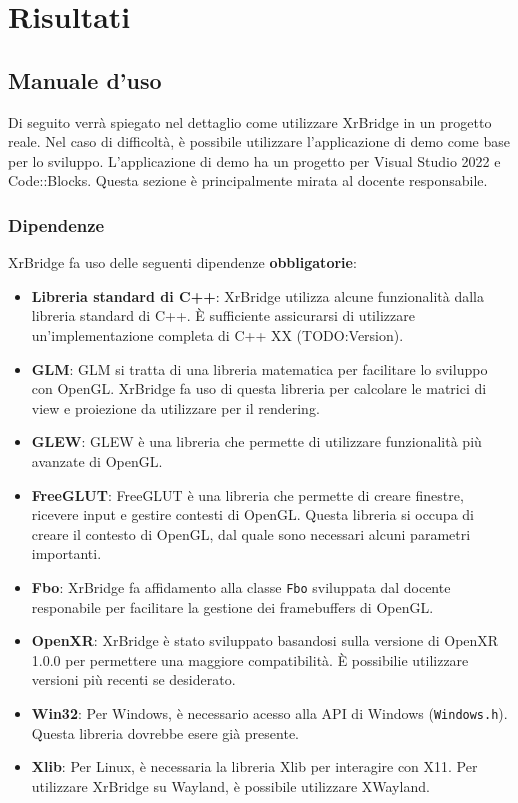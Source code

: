 \documentclass[twoside]{supsistudent}
\begin{document}
\chapter{Risultati}


\section{Manuale d'uso}

Di seguito verrà spiegato nel dettaglio come utilizzare XrBridge in un progetto reale. Nel caso di difficoltà, è possibile utilizzare l'applicazione di demo come base per lo sviluppo. L'applicazione di demo ha un progetto per Visual Studio 2022 e Code::Blocks. Questa sezione è principalmente mirata al docente responsabile.

\subsection{Dipendenze}

XrBridge fa uso delle seguenti dipendenze \textbf{obbligatorie}:

\begin{itemize}
  \item \textbf{Libreria standard di C++}: XrBridge utilizza alcune funzionalità dalla libreria standard di C++. È sufficiente assicurarsi di utilizzare un'implementazione completa di C++ XX (TODO:Version).
  \item \textbf{GLM}: GLM si tratta di una libreria matematica per facilitare lo sviluppo con OpenGL. XrBridge fa uso di questa libreria per calcolare le matrici di view e proiezione da utilizzare per il rendering.
  \item \textbf{GLEW}: GLEW è una libreria che permette di utilizzare funzionalità più avanzate di OpenGL.
  \item \textbf{FreeGLUT}: FreeGLUT è una libreria che permette di creare finestre, ricevere input e gestire contesti di OpenGL. Questa libreria si occupa di creare il contesto di OpenGL, dal quale sono necessari alcuni parametri importanti.
  \item \textbf{Fbo}: XrBridge fa affidamento alla classe \texttt{Fbo} sviluppata dal docente responabile per facilitare la gestione dei framebuffers di OpenGL.
  \item \textbf{OpenXR}: XrBridge è stato sviluppato basandosi sulla versione di OpenXR 1.0.0 per permettere una maggiore compatibilità. È possibilie utilizzare versioni più recenti se desiderato.
  \item \textbf{Win32}: Per Windows, è necessario acesso alla API di Windows (\texttt{Windows.h}). Questa libreria dovrebbe esere già presente.
  \item \textbf{Xlib}: Per Linux, è necessaria la libreria Xlib per interagire con X11. Per utilizzare XrBridge su Wayland, è possibile utilizzare XWayland.
\end{itemize}
\end{document}
